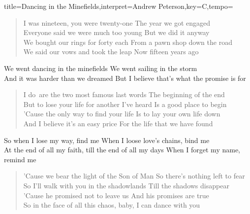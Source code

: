 \documentclass{leadsheet-modern}
\begin{document}
\begin{song}{title={Dancing in the Minefields},interpret={Andrew Peterson},key={C},tempo={}}

\begin{schedule}
\end{schedule}

\begin{verse}
I was nineteen, you were twenty-one
The year we got engaged \\
Everyone said we were much too young
But we did it anyway \\
We bought our rings for forty each
From a pawn shop down the road \\
We said our vows and took the leap
Now fifteen years ago
\end{verse}

\begin{chorus}
We went dancing in the minefields
We went sailing in the storm \\
And it was harder than we dreamed
But I believe that's what the promise is for
\end{chorus}

\begin{verse}
\frqq I do\flqq~are the two most famous last words
The beginning of the end \\
But to lose your life for another I've heard
Is a good place to begin \\
'Cause the only way to find your life
Is to lay your own life down \\
And I believe it's an easy price
For the life that we have found
\end{verse}

\begin{bridge}
So when I lose my way, find me
When I loose love's chains, bind me \\
At the end of all my faith, till the end of all my days
When I forget my name, remind me
\end{bridge}

\begin{verse}
'Cause we bear the light of the Son of Man
So there's nothing left to fear \\
So I'll walk with you in the shadowlands
Till the shadows disappear \\
'Cause he promised not to leave us
And his promises are true \\
So in the face of all this chaos, baby,
I can dance with you
\end{verse}


\end{song}
\end{document}
